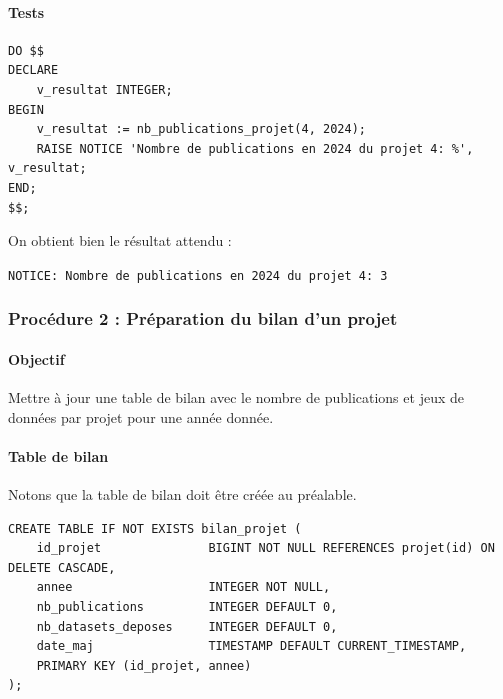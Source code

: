 \documentclass[12pt,a4paper]{article}
\begin{document}
\paragraph{Tests}
\begin{lstlisting}[style=sqlstyle, caption=Tests de la fonction]
DO $$
DECLARE
    v_resultat INTEGER;
BEGIN
    v_resultat := nb_publications_projet(4, 2024);
    RAISE NOTICE 'Nombre de publications en 2024 du projet 4: %', v_resultat;
END;
$$;
\end{lstlisting}

On obtient bien le résultat attendu :

\texttt{NOTICE:  Nombre de publications en 2024 du projet 4: 3}

\subsubsection{Procédure 2 : Préparation du bilan d'un projet}

\paragraph{Objectif}
Mettre à jour une table de bilan avec le nombre de publications et jeux de données par projet pour une année donnée.

\paragraph{Table de bilan}
Notons que la table de bilan doit être créée au préalable.
\begin{lstlisting}[style=sqlstyle, caption=Table bilan\_projet]
CREATE TABLE IF NOT EXISTS bilan_projet (
    id_projet               BIGINT NOT NULL REFERENCES projet(id) ON DELETE CASCADE,
    annee                   INTEGER NOT NULL,
    nb_publications         INTEGER DEFAULT 0,
    nb_datasets_deposes     INTEGER DEFAULT 0,
    date_maj                TIMESTAMP DEFAULT CURRENT_TIMESTAMP,
    PRIMARY KEY (id_projet, annee)
);
\end{lstlisting}
\end{document}
